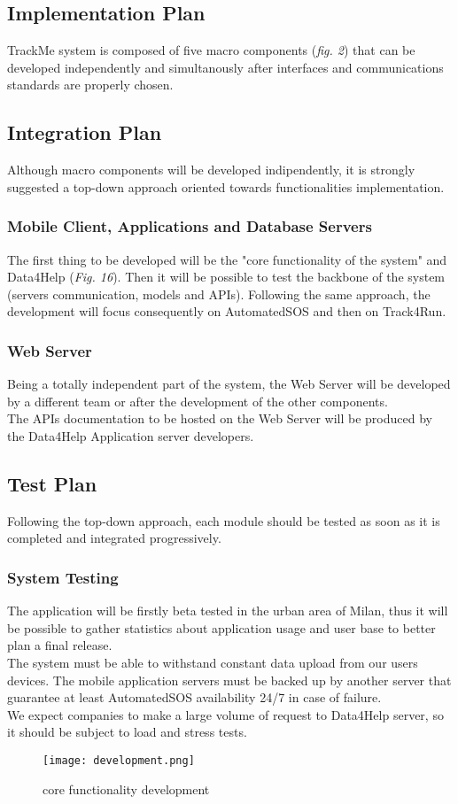 \documentclass[../main.tex]{subfiles}
\begin{document}
\subsection{Implementation Plan}
TrackMe system is composed of five macro components (\textit{fig. 2}) that can be developed independently and simultanously
after interfaces and communications standards are properly chosen.\\



\subsection{Integration Plan}
Although macro components will be developed indipendently, it is strongly suggested a top-down approach oriented towards functionalities
implementation. 
 \subsubsection{Mobile Client, Applications and Database Servers}
    The first thing to be developed will be the "core functionality of the system" and Data4Help (\textit{Fig. 16}). Then it will be possible
    to test the backbone of the system (servers communication, models and APIs). Following the same approach, the development will focus consequently on
    AutomatedSOS and then on Track4Run.

    
 \subsubsection{Web Server}
    Being a totally independent part of the system, the Web Server will be developed by a different team or after the development of the other components.\\
    The APIs documentation to be hosted on the Web Server will be produced by the Data4Help Application server developers. 
\subsection{Test Plan}
    Following the top-down approach, each module should be tested as soon as it is completed and integrated progressively.
\subsubsection{System Testing}
    The application will be firstly beta tested in the urban area of Milan, thus it will be possible
    to gather statistics about application usage and user base to better plan a final release.\\
    The system must be able to withstand constant data upload from our users devices. The mobile application servers must be backed up
    by another server that guarantee at least AutomatedSOS availability 24/7 in case of failure.\\
    We expect companies to make a large volume of request to Data4Help server, so it should be subject to load and stress tests.
    
    \begin{figure}[ht]
        \centering
             \texttt{[image: development.png]}
              \caption{core functionality development}
               \label{fig:development}
    \end{figure}
 
\end{document}

